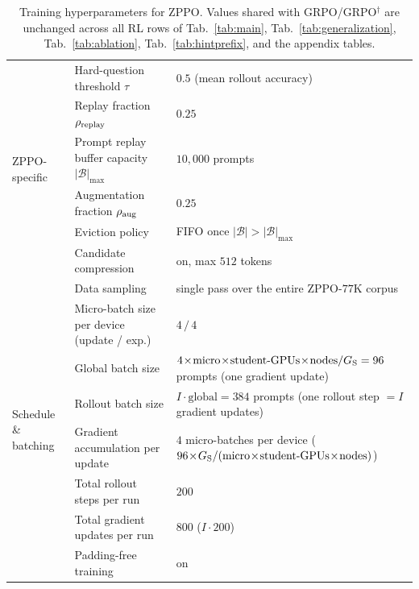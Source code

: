 \begin{table}[!htbp]
{\begin{tabular}{lll}
        \midrule
        \multirow{6}{*}{ZPPO-specific}
            & Hard-question threshold $\tau$              & $0.5$ (mean rollout accuracy) \\
            & Replay fraction $\rho_{\rm replay}$         & $0.25$ \\
            & Prompt replay buffer capacity $|\mathcal{B}|_{\max}$ & $10{,}000$ prompts \\
            & Augmentation fraction $\rho_{\rm aug}$      & $0.25$ \\
            & Eviction policy                             & FIFO once $|\mathcal{B}|\!>\!|\mathcal{B}|_{\max}$ \\
            & Candidate compression                      & on, max $512$ tokens \\
        \midrule
        \multirow{8}{*}{Schedule \& batching}
            & Data sampling                               & single pass over the entire ZPPO-$77$K corpus \\
            & Micro-batch size per device (update / exp.)& $4\,/\,4$ \\
            & Global batch size                            & $4\!\times\!\text{micro}\!\times\!\text{student-GPUs}\!\times\!\text{nodes}/G_{\rm S}=96$ prompts (one gradient update) \\
            & Rollout batch size                          & $I\!\cdot\!\text{global}=384$ prompts (one rollout step $=I$ gradient updates) \\
            & Gradient accumulation per update            & $4$ micro-batches per device ($96\!\times\!G_{\rm S}/(\text{micro}\!\times\!\text{student-GPUs}\!\times\!\text{nodes})$) \\
            & Total rollout steps per run                 & $200$ \\
            & Total gradient updates per run              & $800$ ($I\!\cdot\!200$) \\
            & Padding-free training                       & on \\
        \bottomrule
    \end{tabular}}
    \caption{Training hyperparameters for ZPPO. Values shared with GRPO/GRPO$^{\dagger}$ are unchanged across all RL rows of Tab.~\ref{tab:main}, Tab.~\ref{tab:generalization}, Tab.~\ref{tab:ablation}, Tab.~\ref{tab:hintprefix}, and the appendix tables.}
    \label{tab:appendix:hyperparameters}
\end{table}

